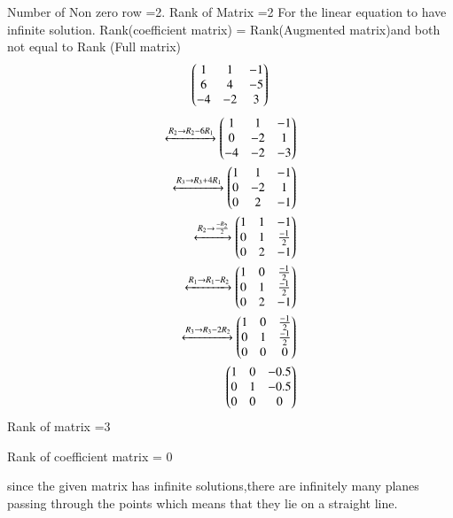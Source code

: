 \documentclass[journal,12pt,twocolumn]{IEEEtran}
\begin{document}
Number of Non zero row =2.
Rank of Matrix =2
For the linear equation to have infinite solution.
Rank(coefficient matrix) = Rank(Augmented matrix)and both not equal to  Rank (Full matrix)
\begin{align}
\begin{pmatrix}1 & 1 & -1\\6 & 4 & -5\\-4 & -2 & 3\end{pmatrix}
\end{align}
\begin{align}
\xleftrightarrow{R_2\rightarrow{R_2-6R_1}}
\begin{pmatrix}1 & 1 & -1\\0 & -2 & 1\\-4 & -2 &-3\end{pmatrix}
\\
\xleftrightarrow{R_3\rightarrow{R_3+4R_1}}
\begin{pmatrix}1 & 1 & -1\\0 & -2 & 1\\0 & 2 & -1\end{pmatrix}
\\
\xleftrightarrow{R_2\rightarrow\frac{-R_2}{2}}\begin{pmatrix}1 & 1 & -1\\0 & 1 & \frac{-1}{2}\\0 & 2 & -1\end{pmatrix}
\\
\xleftrightarrow{R_1\rightarrow{R_1-R_2}}\begin{pmatrix}1 & 0 & \frac{-1}{2}\\0 & 1 & \frac{-1}{2}\\0 & 2 & -1\end{pmatrix}
\\
\xleftrightarrow{R_3\rightarrow{R_3-2R_2}}
\begin{pmatrix}1 & 0 & \frac{-1}{2}\\0 & 1 & \frac{-1}{2}\\0 & 0 & 0\end{pmatrix}
\\
\begin{pmatrix}1 & 0 & -0.5\\0 & 1 & -0.5\\0 & 0 & 0\end{pmatrix}
\end{align}
Rank of matrix =3

Rank of coefficient matrix = 0

since the given matrix has infinite solutions,there are infinitely many planes passing through the points which means that they lie on a straight line.
\end{document}
